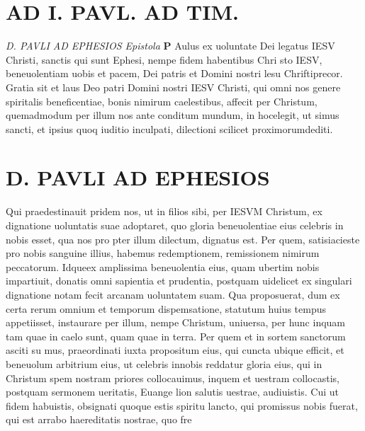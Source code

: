 \documentclass{article}
\begin{document}
\begin{pages}
\section*{AD I. PAVL. AD TIM. }
\marginpar{[ p.9 ]}
\marginpar{[ p.10 ]}
\marginpar{[ p.11 ]}
\marginpar{[ p.B ]}
\textit{D. PAVLI AD EPHESIOS Epistola}
\textbf{P }\pstart Aulus ex uoluntate Dei legatus IESV Christi, sanctis qui sunt Ephesi, nempe fidem habentibus Chri sto IESV, beneuolentiam uobis et pacem, Dei patris et Domini nostri lesu Chriftiprecor.  \pend\pstart Gratia sit et laus Deo patri Domini nostri IESV Christi, qui omni nos genere spiritalis beneficentiae, bonis nimirum caelestibus, affecit per Christum, quemadmodum per illum nos ante conditum mundum, in hocelegit, ut simus sancti, et ipsius quoq iuditio inculpati, dilectioni scilicet proximorumdediti.  \pend
\section*{D. PAVLI AD EPHESIOS }
\marginpar{[ p.3.  ]}
\marginpar{[ p.4.  ]}
\marginpar{[ p.5.  ]}
\marginpar{[ p.6.  ]}
\marginpar{[ p.7.  ]}\pstart Qui praedestinauit pridem nos, ut in filios sibi, per IESVM Christum, ex dignatione uoluntatis suae adoptaret, quo gloria beneuolentiae eius celebris in nobis esset, qua nos pro pter illum dilectum, dignatus est.  \pend\pstart Per  quem, satisiacieste pro nobis sanguine illius, habemus redemptionem, remissionem nimirum peccatorum.  Idqueex amplissima beneuolentia eius, quam ubertim nobis impartiuit, donatis omni sapientia et prudentia, postquam uidelicet ex singulari dignatione notam fecit arcanam uoluntatem suam.  \pend\pstart Qua proposuerat, dum ex certa rerum omnium et temporum dispemsatione, statutum huius tempus appetiisset, instaurare per illum, nempe Christum, uniuersa, per hunc inquam tam quae in caelo sunt, quam quae in terra.  \pend\pstart Per quem et in sortem sanctorum asciti su mus, praeordinati iuxta propositum eius, qui cuncta ubique efficit, et beneuolum arbitrium eius, ut celebris innobis reddatur gloria eius, qui in Christum spem nostram priores collocauimus, inquem et uestram collocastis, postquam sermonem ueritatis, Euange lion salutis uestrae, audiuistis.  \pend\pstart Cui ut fidem habuistis, obsignati quoque estis spiritu lancto, qui promissus nobis fuerat, qui est arrabo haereditatis nostrae, quo fre  \pend

\end{pages}
\end{document}
